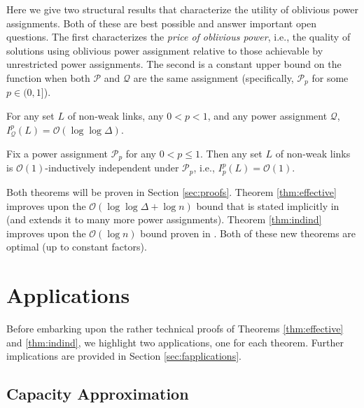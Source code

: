 \documentclass[11pt]{amsart}
\newcommand{\cal}[1]{\mathcal{#1}}
\newcommand{\BO}{\mathcal{O}}
\def\calP{{\cal P}}
\def\calQ{{\cal Q}}
\def\calP{{\cal P}}   \def\calM{{\cal M}}   \def\calU{{\cal U}}   \newcommand{\PCopt}{\overline{OPT}}
\newcommand{\powp}{\calP_p}
\begin{document}
Here we give two structural results that characterize the utility of
oblivious power assignments. Both of these are best possible and
answer important open questions. The first characterizes the
\emph{price of oblivious power}, i.e., the quality of solutions using
oblivious power assignment relative to those achievable by
unrestricted power assignments. The second is a constant upper bound
on the function when both $\calP$ and $\calQ$ are the same assignment
(specifically, $\powp$ for some $p \in (0, 1]$).


\begin{theorem}
For any set $L$ of non-weak links, any $0 < p < 1$, and any power assignment $\calQ$, $I^{p}_{\calQ}(L) = \BO(\log \log \Delta)$.
\label{thm:effective}
\end{theorem}
\iffalse
\begin{theorem}
Fix $\powp$ for any $0 < p \le 1$. Then for any set of links $L$ that are non-weak using $\powp$,
$$I^{p}_{\calQ}(L) = \BO(\log \log \Delta)$$
for \emph{any} power assignment $\calQ$.
\label{thm:effective}
\end{theorem}
\fi





\begin{theorem}
Fix a power assignment $\powp$ for any $0 < p \le 1$. 
Then any set $L$ of non-weak links is $\BO(1)$-inductively independent under $\powp$, i.e., $I^p_p(L) = \BO(1)$.
\label{thm:indind}
\end{theorem}
Both theorems will be proven in Section \ref{sec:proofs}.
Theorem \ref{thm:effective} improves upon the $\BO(\log \log \Delta + \log n)$ bound that is stated implicitly in \cite{SODA11} (and extends it to many more power assignments). Theorem \ref{thm:indind} improves
upon the $\BO(\log n)$ bound proven in \cite{KV10}. Both of these new theorems are
optimal (up to constant factors).

\section{Applications}
\label{sec:applications}
Before embarking upon the rather technical proofs of Theorems
\ref{thm:effective} and \ref{thm:indind}, we highlight two
applications, one for each theorem. Further implications are provided
in Section \ref{sec:fapplications}.

\subsection{Capacity Approximation}
\label{sec:capacity}
\end{document}
